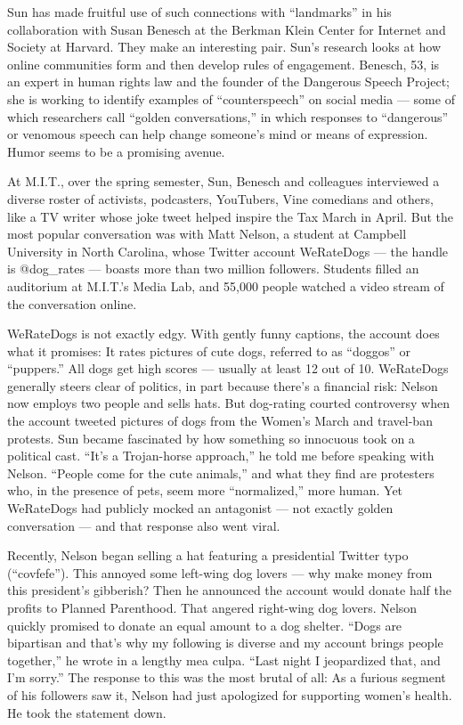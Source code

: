 Sun has made fruitful use of such connections with ``landmarks'' in his
collaboration with Susan Benesch at the Berkman Klein Center for
Internet and Society at Harvard. They make an interesting pair. Sun's
research looks at how online communities form and then develop rules of
engagement. Benesch, 53, is an expert in human rights law and the
founder of the Dangerous Speech Project; she is working to identify
examples of ``counterspeech'' on social media --- some of which
researchers call ``golden conversations,'' in which responses to
``dangerous'' or venomous speech can help change someone's mind or means
of expression. Humor seems to be a promising avenue.

At M.I.T., over the spring semester, Sun, Benesch and colleagues
interviewed a diverse roster of activists, podcasters, YouTubers, Vine
comedians and others, like a TV writer whose joke tweet helped inspire
the Tax March in April. But the most popular conversation was with Matt
Nelson, a student at Campbell University in North Carolina, whose
Twitter account WeRateDogs --- the handle is @dog\_rates --- boasts more
than two million followers. Students filled an auditorium at M.I.T.'s
Media Lab, and 55,000 people watched a video stream of the conversation
online.

WeRateDogs is not exactly edgy. With gently funny captions, the account
does what it promises: It rates pictures of cute dogs, referred to as
``doggos'' or ``puppers.'' All dogs get high scores --- usually at least
12 out of 10. WeRateDogs generally steers clear of politics, in part
because there's a financial risk: Nelson now employs two people and
sells hats. But dog-rating courted controversy when the account tweeted
pictures of dogs from the Women's March and travel-ban protests. Sun
became fascinated by how something so innocuous took on a political
cast. ``It's a Trojan-horse approach,'' he told me before speaking with
Nelson. ``People come for the cute animals,'' and what they find are
protesters who, in the presence of pets, seem more ``normalized,'' more
human. Yet WeRateDogs had publicly mocked an antagonist --- not exactly
golden conversation --- and that response also went viral.

Recently, Nelson began selling a hat featuring a presidential Twitter
typo (``covfefe''). This annoyed some left-wing dog lovers --- why make
money from this president's gibberish? Then he announced the account
would donate half the profits to Planned Parenthood. That angered
right-wing dog lovers. Nelson quickly promised to donate an equal amount
to a dog shelter. ``Dogs are bipartisan and that's why my following is
diverse and my account brings people together,'' he wrote in a lengthy
mea culpa. ``Last night I jeopardized that, and I'm sorry.'' The
response to this was the most brutal of all: As a furious segment of his
followers saw it, Nelson had just apologized for supporting women's
health. He took the statement down.

